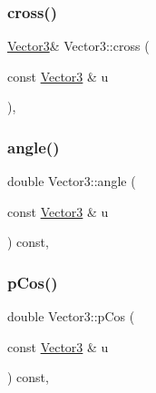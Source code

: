 \mbox{\label{class_vector3_ab4221b101df67f562347dde6738c66fc}} 
\subsubsection{\texorpdfstring{cross()}{cross()}}
{\footnotesize\ttfamily \mbox{\hyperlink{class_vector3}{Vector3}}\& Vector3\+::cross (\begin{DoxyParamCaption}\item[{const \mbox{\hyperlink{class_vector3}{Vector3}} \&}]{u }\end{DoxyParamCaption})\hspace{0.3cm}{\ttfamily [inline]}, {\ttfamily [protected]}}

\mbox{\label{class_vector3_ab724696b92eb5f408a7d13de68ce6e8c}} 
\subsubsection{\texorpdfstring{angle()}{angle()}}
{\footnotesize\ttfamily double Vector3\+::angle (\begin{DoxyParamCaption}\item[{const \mbox{\hyperlink{class_vector3}{Vector3}} \&}]{u }\end{DoxyParamCaption}) const\hspace{0.3cm}{\ttfamily [inline]}, {\ttfamily [protected]}}

\mbox{\label{class_vector3_aa49b3af23187b6a923870829a65d731c}} 
\subsubsection{\texorpdfstring{pCos()}{pCos()}}
{\footnotesize\ttfamily double Vector3\+::p\+Cos (\begin{DoxyParamCaption}\item[{const \mbox{\hyperlink{class_vector3}{Vector3}} \&}]{u }\end{DoxyParamCaption}) const\hspace{0.3cm}{\ttfamily [inline]}, {\ttfamily [protected]}}

\mbox{\label{class_vector3_acadf5e36328563bc0cc11f1eb985d56a}} 
